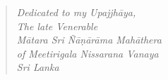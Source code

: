 \cleartorecto
\thispagestyle{empty}

\mbox{}\vfill

\begin{verse}

{\itshape
Dedicated to my Upajjhāya,\\
The late Venerable\\
Mātara Sri Ñāṇārāma Mahāthera\\
of Meetirigala Nissarana Vanaya\\
Sri Lanka
}


\end{verse}

\vfill\mbox{}

